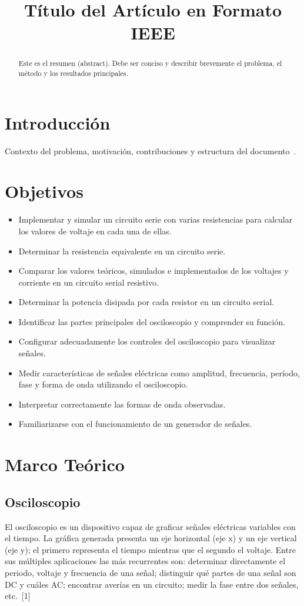 \documentclass[conference]{IEEEtran} %
\title{Título del Artículo en Formato IEEE}
\author{
\IEEEauthorblockN{Nombre Apellido\IEEEauthorrefmark{1}, Nombre Apellido\IEEEauthorrefmark{2}}
\IEEEauthorblockA{\IEEEauthorrefmark{1}Afiliación 1 \\
Email: autor1@ejemplo.com}
\IEEEauthorblockA{\IEEEauthorrefmark{2}Afiliación 2 \\
Email: autor2@ejemplo.com}
}
\begin{document}
\maketitle

\begin{abstract}
Este es el resumen (abstract). Debe ser conciso y describir brevemente el problema, el método y los resultados principales.
\end{abstract}


\section{Introducción}
Contexto del problema, motivación, contribuciones y estructura del documento~\cite{ieeehowto,lamport94}.

\section{Objetivos}
\begin{itemize}
  \item Implementar y simular un circuito serie con varias resistencias para calcular los valores de voltaje en cada una de ellas.
  \item Determinar la resistencia equivalente en un circuito serie.
  \item Comparar los valores te\'oricos, simulados e implementados de los voltajes y corriente en un circuito serial resistivo.
  \item Determinar la potencia disipada por cada resistor en un circuito serial.
  \item Identificar las partes principales del osciloscopio y comprender su funci\'on.
  \item Configurar adecuadamente los controles del osciloscopio para visualizar se\~nales.
  \item Medir caracter\'isticas de se\~nales el\'ectricas como amplitud, frecuencia, per\'iodo, fase y forma de onda utilizando el osciloscopio.
  \item Interpretar correctamente las formas de onda observadas.
  \item Familiarizarse con el funcionamiento de un generador de se\~nales.
\end{itemize}


\section{Marco Teórico}
\subsection{Osciloscopio}
El osciloscopio es un dispositivo capaz de graficar señales eléctricas variables con el tiempo. La gráfica generada presenta un eje horizontal (eje x) y un eje vertical (eje y); el primero representa el tiempo mientras que el segundo el voltaje. Entre sus múltiples aplicaciones las más recurrentes son: determinar directamente el periodo, voltaje y frecuencia de una señal; distinguir qué partes de una señal son DC y cuáles AC; encontrar averías en un circuito; medir la fase entre dos señales, etc.~[1]
\end{document}
